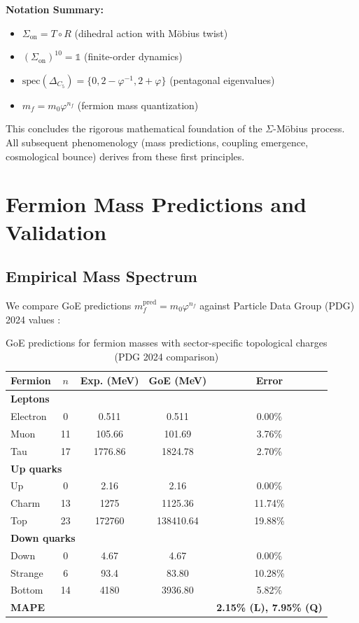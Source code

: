 \documentclass[12pt]{article}
\begin{document}
\textbf{Notation Summary:}
\begin{itemize}
\item $\Sigma_{\text{on}} = T \circ R$ (dihedral action with M\"obius twist)
\item $(\Sigma_{\text{on}})^{10} = \mathbb{1}$ (finite-order dynamics)
\item $\text{spec}(\Delta_{C_5}) = \{0, 2 - \varphi^{-1}, 2 + \varphi\}$ (pentagonal eigenvalues)
\item $m_f = m_0 \varphi^{n_f}$ (fermion mass quantization)
\end{itemize}

This concludes the rigorous mathematical foundation of the $\Sigma$-M\"obius process. All subsequent phenomenology (mass predictions, coupling emergence, cosmological bounce) derives from these first principles.

\section{Fermion Mass Predictions and Validation}

\subsection{Empirical Mass Spectrum}

We compare GoE predictions $m_f^{\text{pred}} = m_0 \varphi^{n_f}$ against Particle Data Group (PDG) 2024 values \cite{pdg2024}:

\begin{table}[H]
\centering
\caption{GoE predictions for fermion masses with sector-specific topological charges (PDG 2024 comparison)}
\small
\begin{tabular}{lcccc}
\toprule
\textbf{Fermion} & \textbf{$n$} & \textbf{Exp. (MeV)} & \textbf{GoE (MeV)} & \textbf{Error} \\
\midrule
\multicolumn{5}{l}{\textbf{Leptons}} \\
Electron & 0 & 0.511 & 0.511 & 0.00\% \\
Muon & 11 & 105.66 & 101.69 & 3.76\% \\
Tau & 17 & 1776.86 & 1824.78 & 2.70\% \\
\midrule
\multicolumn{5}{l}{\textbf{Up quarks}} \\
Up & 0 & 2.16 & 2.16 & 0.00\% \\
Charm & 13 & 1275 & 1125.36 & 11.74\% \\
Top & 23 & 172760 & 138410.64 & 19.88\% \\
\midrule
\multicolumn{5}{l}{\textbf{Down quarks}} \\
Down & 0 & 4.67 & 4.67 & 0.00\% \\
Strange & 6 & 93.4 & 83.80 & 10.28\% \\
Bottom & 14 & 4180 & 3936.80 & 5.82\% \\
\midrule
\textbf{MAPE} & & & & \textbf{2.15\% (L), 7.95\% (Q)} \\
\bottomrule
\end{tabular}
\label{tab:fermion_masses}
\end{table}
\end{document}
